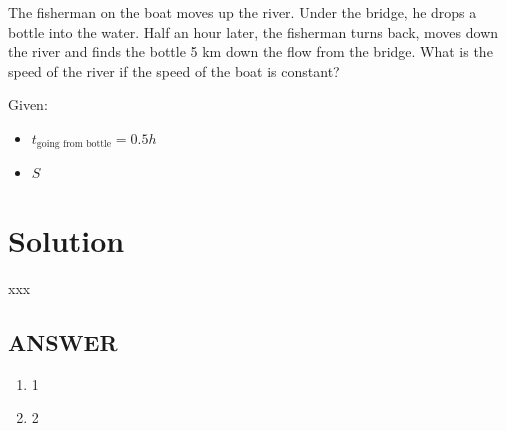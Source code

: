 The fisherman on the boat moves up the river. Under the bridge, he drops a bottle into the water.
Half an hour later, the fisherman turns back, moves down the river and finds the bottle 5 km
down the flow from the bridge. What is the speed of the river if the speed of the boat is constant?

\bigbreak Given: \begin{itemize}
    \item $t_{\text{going from bottle}} = 0.5h$
    \item $S_{}$
\end{itemize}

\section*{Solution}

xxx

\vfill
\subsection*{ANSWER}
\begin{enumerate}
    \item 1
    \item 2
\end{enumerate}